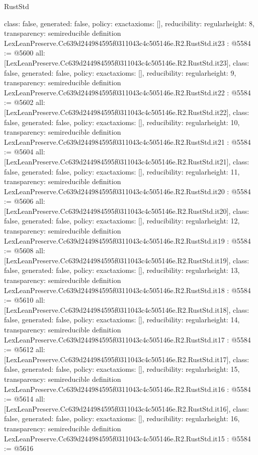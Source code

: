 \begin{lexlean}{RustStd}
\begin{coremodule}
{  class: false,
  generated: false,
  policy: exact{axioms: []},
  reducibility: regular{height: 8},
  transparency: semireducible
}
definition LexLeanPreserve.Cc639d244984595f0311043c4c505146e.R2.RustStd.it23 : @5584 := @5600 {
  all: [LexLeanPreserve.Cc639d244984595f0311043c4c505146e.R2.RustStd.it23],
  class: false,
  generated: false,
  policy: exact{axioms: []},
  reducibility: regular{height: 9},
  transparency: semireducible
}
definition LexLeanPreserve.Cc639d244984595f0311043c4c505146e.R2.RustStd.it22 : @5584 := @5602 {
  all: [LexLeanPreserve.Cc639d244984595f0311043c4c505146e.R2.RustStd.it22],
  class: false,
  generated: false,
  policy: exact{axioms: []},
  reducibility: regular{height: 10},
  transparency: semireducible
}
definition LexLeanPreserve.Cc639d244984595f0311043c4c505146e.R2.RustStd.it21 : @5584 := @5604 {
  all: [LexLeanPreserve.Cc639d244984595f0311043c4c505146e.R2.RustStd.it21],
  class: false,
  generated: false,
  policy: exact{axioms: []},
  reducibility: regular{height: 11},
  transparency: semireducible
}
definition LexLeanPreserve.Cc639d244984595f0311043c4c505146e.R2.RustStd.it20 : @5584 := @5606 {
  all: [LexLeanPreserve.Cc639d244984595f0311043c4c505146e.R2.RustStd.it20],
  class: false,
  generated: false,
  policy: exact{axioms: []},
  reducibility: regular{height: 12},
  transparency: semireducible
}
definition LexLeanPreserve.Cc639d244984595f0311043c4c505146e.R2.RustStd.it19 : @5584 := @5608 {
  all: [LexLeanPreserve.Cc639d244984595f0311043c4c505146e.R2.RustStd.it19],
  class: false,
  generated: false,
  policy: exact{axioms: []},
  reducibility: regular{height: 13},
  transparency: semireducible
}
definition LexLeanPreserve.Cc639d244984595f0311043c4c505146e.R2.RustStd.it18 : @5584 := @5610 {
  all: [LexLeanPreserve.Cc639d244984595f0311043c4c505146e.R2.RustStd.it18],
  class: false,
  generated: false,
  policy: exact{axioms: []},
  reducibility: regular{height: 14},
  transparency: semireducible
}
definition LexLeanPreserve.Cc639d244984595f0311043c4c505146e.R2.RustStd.it17 : @5584 := @5612 {
  all: [LexLeanPreserve.Cc639d244984595f0311043c4c505146e.R2.RustStd.it17],
  class: false,
  generated: false,
  policy: exact{axioms: []},
  reducibility: regular{height: 15},
  transparency: semireducible
}
definition LexLeanPreserve.Cc639d244984595f0311043c4c505146e.R2.RustStd.it16 : @5584 := @5614 {
  all: [LexLeanPreserve.Cc639d244984595f0311043c4c505146e.R2.RustStd.it16],
  class: false,
  generated: false,
  policy: exact{axioms: []},
  reducibility: regular{height: 16},
  transparency: semireducible
}
definition LexLeanPreserve.Cc639d244984595f0311043c4c505146e.R2.RustStd.it15 : @5584 := @5616 {
}
\end{coremodule}
\end{lexlean}
